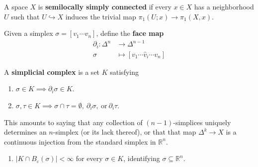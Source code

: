 
\begin{definition}

\end{definition}


\begin{definition}

A space \(X\) is \textbf{semilocally simply connected} if every
\(x\in X\) has a neighborhood \(U\) such that \(U\hookrightarrow X\)
induces the trivial map \(\pi_1(U;x) \to \pi_1(X, x)\).

\end{definition}

\begin{definition}

\end{definition}


\begin{definition}

Given a simplex \(\sigma = [v_1 \cdots v_n]\), define the \textbf{face
map}
\begin{align*}
{\partial}_i:\Delta^n &\to \Delta^{n-1} \\ 
\sigma &\mapsto  [v_1 \cdots \widehat{v}_i \cdots v_n]
\end{align*}

A \textbf{simplicial complex} is a set \(K\) satisfying

\begin{enumerate}
\def\labelenumi{\arabic{enumi}.}
\item
  \(\sigma \in K \implies {\partial}_i\sigma \in K\).
\item
  \(\sigma,\tau\in K \implies \sigma\cap\tau = \emptyset,~ {\partial}_i\sigma,~\text{or}~{\partial}_i\tau\).
\end{enumerate}

This amounts to saying that any collection of \((n-1)\)-simplices
uniquely determines an \(n\)-simplex (or its lack thereof), or that that
map \(\Delta^k \to X\) is a continuous injection from the standard
simplex in \({\mathbb{R}}^n\).

\begin{enumerate}
\def\labelenumi{\arabic{enumi}.}
\setcounter{enumi}{2}
\tightlist
\item
  \({\left\lvert {K\cap B_\varepsilon(\sigma)} \right\rvert} < \infty\)
  for every \(\sigma\in K\), identifying
  \(\sigma \subseteq {\mathbb{R}}^n\).
\end{enumerate}

\end{definition}

